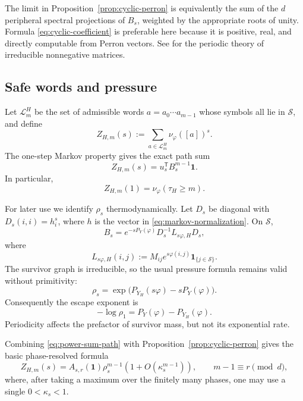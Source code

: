 \begin{remark}
The limit in Proposition~\ref{prop:cyclic-perron} is equivalently the
sum of the \(d\) peripheral spectral projections of \(B_s\), weighted
by the appropriate roots of unity.  Formula
\eqref{eq:cyclic-coefficient} is preferable here because it is positive,
real, and directly computable from Perron vectors.  See
\citet{Seneta2006} for the periodic theory of irreducible nonnegative
matrices.
\end{remark}

\subsection{Safe words and pressure}

Let \(\mathcal L_m^H\) be the set of admissible words
\(a=a_0\cdots a_{m-1}\) whose symbols all lie in \(\mathcal S\), and
define
\[
  Z_{H,m}(s):=\sum_{a\in\mathcal L_m^H}\nu_\varphi([a])^s.
\]
The one-step Markov property gives the exact path sum
\begin{equation}
  Z_{H,m}(s)=u_s^{\mathsf T}B_s^{m-1}\mathbf1.
  \label{eq:power-sum-path}
\end{equation}
In particular,
\[
  Z_{H,m}(1)=\nu_\varphi(\tau_H\geq m).
\]

For later use we identify \(\rho_s\) thermodynamically.  Let
\(D_s\) be diagonal with \(D_s(i,i)=h_i^s\), where \(h\) is the vector
in \eqref{eq:markov-normalization}.  On \(\mathcal S\),
\[
  B_s
  =e^{-sP_Y(\varphi)}D_s^{-1}L_{s\varphi,H}D_s,
\]
where
\[
  L_{s\varphi,H}(i,j)
  :=M_{ij}e^{s\varphi(i,j)}\mathbf1_{\{j\in\mathcal S\}}.
\]
The survivor graph is irreducible, so the usual pressure formula remains
valid without primitivity:
\begin{equation}
  \rho_s
  =\exp\bigl(P_{Y_H}(s\varphi)-sP_Y(\varphi)\bigr).
  \label{eq:rho-pressure}
\end{equation}
Consequently the escape exponent is
\[
  -\log\rho_1=P_Y(\varphi)-P_{Y_H}(\varphi).
\]
Periodicity affects the prefactor of survivor mass, but not its
exponential rate.

Combining \eqref{eq:power-sum-path} with
Proposition~\ref{prop:cyclic-perron} gives the basic phase-resolved
formula
\begin{equation}
  Z_{H,m}(s)
  =A_{s,r}(\mathbf1)\rho_s^{m-1}
    (1+O(\kappa_s^{m-1})),
  \qquad m-1\equiv r\pmod d,
  \label{eq:unconditioned-phase-power}
\end{equation}
where, after taking a maximum over the finitely many phases, one may use
a single \(0<\kappa_s<1\).

